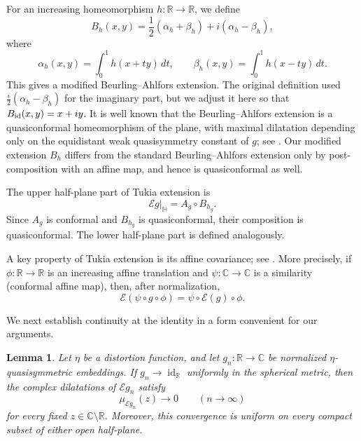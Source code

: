\documentclass[11pt]{amsart}
\numberwithin{equation}{section}
\newtheorem{lemma}[theorem]{Lemma}
\theoremstyle{definition} %
\theoremstyle{remarkstyle}
\newcommand{\R}{\mathbb{R}}
\newcommand{\C}{\mathbb{C}}
\newcommand{\Hh}{\mathbb{H}}
\newcommand{\id}{\operatorname{id}}
\begin{document}
For an increasing homeomorphism $h\colon\R\to\R$, we define
\begin{equation*}
 B_h(x,y)=\frac12(\alpha_h+\beta_h)
 +i(\alpha_h-\beta_h),
\end{equation*}
where
\begin{equation}\label{eq:alphabeta}
 \alpha_h(x,y)=\int_0^1h(x+ty)\,dt,
 \qquad
 \beta_h(x,y)=\int_0^1h(x-ty)\,dt.
\end{equation}
This gives a modified Beurling--Ahlfors extension. The original definition used $\frac{i}{2}(\alpha_h-\beta_h)$ for the imaginary part, but we adjust it here so that $B_{\rm id}(x,y)=x+iy$. 
It is well known that the Beurling--Ahlfors extension is a quasiconformal homeomorphism of the plane, with maximal dilatation depending only on the equidistant weak quasisymmetry constant of $g$; see \cite[Section~6]{BA}. 
Our modified extension $B_h$ differs from the standard Beurling--Ahlfors extension only by post-composition with an affine map, and hence is quasiconformal as well.

The upper half-plane part of Tukia extension is
\begin{equation*}
 \mathcal E g|_{\Hh}=A_g\circ B_{h_g}.
\end{equation*}
Since $A_g$ is conformal and $B_{h_g}$ is quasiconformal, their composition is quasiconformal.
The lower half-plane part is defined analogously. 

A key property of Tukia extension is its affine covariance; see \cite[Section~5]{TukiaExtension}. More precisely, if $\phi\colon\R\to\R$ is an increasing affine translation and $\psi\colon\C\to\C$ is a similarity (conformal affine map), then, after normalization,
\begin{equation}\label{eq:Tukia-naturality}
 \mathcal E(\psi\circ g\circ\phi)
 =\psi\circ\mathcal E(g)\circ\phi.
\end{equation}

We next establish continuity at the identity in a form convenient for our arguments.

\begin{lemma}\label{lem:extension-continuity}
Let $\eta$ be a distortion function, and let $g_n\colon\R\to\C$ be normalized $\eta$-quasisymmetric embeddings.  
If $g_n\to\id_{\R}$ uniformly in the spherical metric, then the complex dilatations of $\mathcal{E}g_n$ satisfy
\[
 \mu_{\mathcal Eg_n}(z)\to 0 \qquad (n\to\infty)
\]
for every fixed $z\in\C\setminus\R$.
Moreover, this convergence is uniform on every compact subset of either open half-plane.
\end{lemma}
\end{document}
